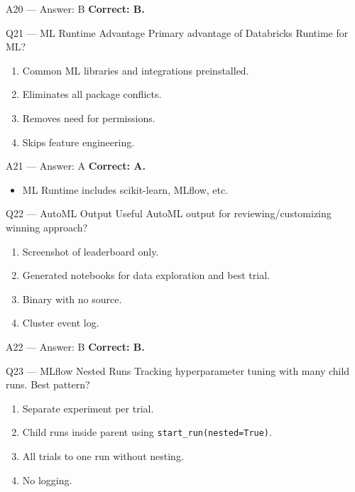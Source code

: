 \documentclass[aspectratio=169,9pt]{beamer}
\begin{document}
	\begin{frame}{A20 — Answer: B}
		\textbf{Correct: B.}
	\end{frame}
	
	\begin{frame}{Q21 — ML Runtime Advantage}
		Primary advantage of Databricks Runtime for ML?
		\begin{enumerate}[label=\Alph*.]
			\item Common ML libraries and integrations preinstalled.
			\item Eliminates all package conflicts.
			\item Removes need for permissions.
			\item Skips feature engineering.
		\end{enumerate}
	\end{frame}
	
	\begin{frame}{A21 — Answer: A}
		\textbf{Correct: A.}
		\begin{itemize}
			\item ML Runtime includes scikit-learn, MLflow, etc.
		\end{itemize}
	\end{frame}
	
	\begin{frame}{Q22 — AutoML Output}
		Useful AutoML output for reviewing/customizing winning approach?
		\begin{enumerate}[label=\Alph*.]
			\item Screenshot of leaderboard only.
			\item Generated notebooks for data exploration and best trial.
			\item Binary with no source.
			\item Cluster event log.
		\end{enumerate}
	\end{frame}
	
	\begin{frame}{A22 — Answer: B}
		\textbf{Correct: B.}
	\end{frame}
	
	\begin{frame}{Q23 — MLflow Nested Runs}
		Tracking hyperparameter tuning with many child runs. Best pattern?
		\begin{enumerate}[label=\Alph*.]
			\item Separate experiment per trial.
			\item Child runs inside parent using \texttt{start\_run(nested=True)}.
			\item All trials to one run without nesting.
			\item No logging.
		\end{enumerate}
	\end{frame}
	
\end{document}

